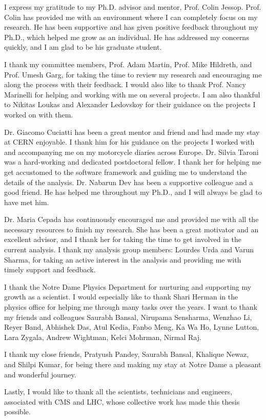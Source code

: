 \documentclass[final,numrefs,sort&compress,noinfo]{nddiss2e}
\begin{document}
\begin{acknowledge}

  I express my gratitude to my Ph.D. advisor and mentor, Prof. Colin Jessop. Prof. Colin has provided me with an environment where I can completely focus on my research. He has been supportive and has given positive feedback throughout my Ph.D., which helped me grow as an individual. He has addressed my concerns quickly, and I am glad to be his graduate student.

  I thank my committee members, Prof. Adam Martin, Prof. Mike Hildreth, and Prof. Umesh Garg, for taking the time to review my research and encouraging me along the process with their feedback. I would also like to thank Prof. Nancy Marinelli for helping and working with me on several projects. I am also thankful to Nikitas Loukas and Alexander Ledovskoy for their guidance on the projects I worked on with them.

  Dr. Giacomo Cuciatti has been a great mentor and friend and had made my stay at CERN enjoyable. I thank him for his guidance on the projects I worked with and accompanying me on my motorcycle diaries across Europe. Dr. Silvia Taroni was a hard-working and dedicated postdoctoral fellow. I thank her for helping me get accustomed to the software framework and guiding me to understand the details of the analysis. Dr. Nabarun Dev has been a supportive colleague and a good friend. He has helped me throughout my Ph.D., and I will always be glad to have met him.

  Dr. Maria Cepada has continuously encouraged me and provided me with all the necessary resources to finish my research. She has been a great motivator and an excellent advisor, and I thank her for taking the time to get involved in the current analysis. I thank my analysis group members: Lourdes Urda and Varun Sharma, for taking an active interest in the analysis and providing me with timely support and feedback.

  I thank the Notre Dame Physics Department for nurturing and supporting my growth as a scientist. I would especially like to thank Shari Herman in the physics office for helping me through many tasks over the years. I want to thank my friends and colleagues Saurabh Bansal, Nirupama Sensharma, Wenzhao Li, Reyer Band, Abhishek Das, Atul Kedia, Fanbo Meng, Ka Wa Ho, Lynne Lutton, Lara Zygala, Andrew Wightman, Kelci Mohrman, Nirmal Raj.

  I thank my close friends, Pratyush Pandey, Saurabh Bansal, Khalique Newaz, and Shilpi Kumar, for being there and making my stay at Notre Dame a pleasant and wonderful journey.

  Lastly, I would like to thank all the scientists, technicians and engineers, associated with CMS and LHC, whose collective work has made this thesis possible.

\end{acknowledge}
\end{document}
